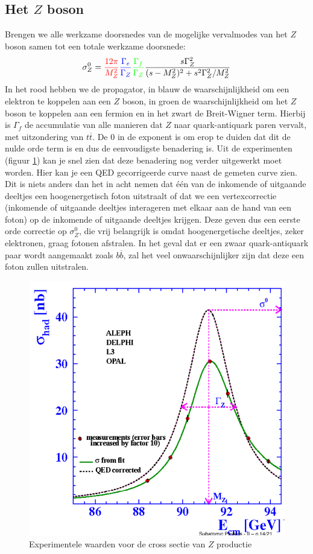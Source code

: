 \documentclass[../main.tex]{subfiles}
\begin{document}
\subsection{Het $Z$ boson}%
\label{sub:het_z_boson}

Brengen we alle werkzame doorsnedes van de mogelijke vervalmodes van het $Z$ boson samen tot een totale werkzame doorsnede:
\begin{equation}
    \begin{aligned}
        \label{eq:z_werkzame_doorsnede}
        \sigma_Z^0 = {\color{red} \frac{12\pi}{M_Z^2}} {\color{blue} \frac{\Gamma_e}{\Gamma_Z}} {\color{green} \frac{\Gamma_f}{\Gamma_Z}} \frac{s\Gamma_Z^2}{(s-M_Z^2)^2 + s^2\Gamma_Z^2/M_Z^2}
    \end{aligned}
\end{equation}
In het rood hebben we de propagator, in blauw de waarschijnlijkheid om een elektron te koppelen aan een $Z$ boson, in groen de waarschijnlijkheid om het $Z$ boson te koppelen aan een fermion en in het zwart de Breit-Wigner term. Hierbij is $\Gamma_f$ de accumulatie van alle manieren dat $Z$ naar quark-antiquark paren vervalt, met uitzondering van $t\overline t$. De 0 in de exponent is om erop te duiden dat dit de nulde orde term is en dus de eenvoudigste benadering is. Uit de experimenten (figuur \ref{fig:elektroweak_precision_tests/het_z_boson}) kan je snel zien dat deze benadering nog verder uitgewerkt moet worden. Hier kan je een QED gecorrigeerde curve naast de gemeten curve zien. Dit is niets anders dan het in acht nemen dat één van de inkomende of uitgaande deeltjes een hoogenergetisch foton uitstraalt of dat we een vertexcorrectie (inkomende of uitgaande deeltjes interageren met elkaar aan de hand van een foton) op de inkomende of uitgaande deeltjes krijgen. Deze geven dus een eerste orde correctie op $\sigma_Z^0$, die vrij belangrijk is omdat hoogenergetische deeltjes, zeker elektronen, graag fotonen afstralen. In het geval dat er een zwaar quark-antiquark paar wordt aangemaakt zoals $b\overline b$, zal het veel onwaarschijnlijker zijn dat deze een foton zullen uitstralen.

\begin{figure}[h]
    \centering
    \includegraphics[width=0.6\linewidth]{elektroweak_precision_tests/het_z_boson.png}
    \caption{Experimentele waarden voor de cross sectie van $Z$ productie}%
    \label{fig:elektroweak_precision_tests/het_z_boson}
\end{figure}
\end{document}
